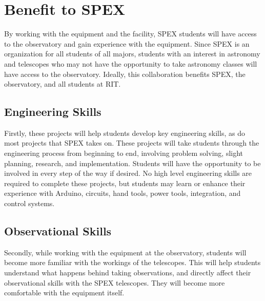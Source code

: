 \documentclass[conference]{IEEEtran} %
\begin{document}
\section{Benefit to SPEX}
\label{sec:benefit}

By working with the equipment and the facility, SPEX students will have access to the observatory and gain experience with the equipment.
Since SPEX is an organization for all students of all majors, students with an interest in astronomy and telescopes who may not have the opportunity to take astronomy classes will have access to the observatory.
Ideally, this collaboration benefits SPEX, the observatory, and all students at RIT.


\subsection{Engineering Skills}
\label{subsec:engineeringSkills}
Firstly, these projects will help students develop key engineering skills, as do most projects that SPEX takes on.
These projects will take students through the engineering process from beginning to end, involving problem solving, slight planning, research, and implementation.
Students will have the opportunity to be involved in every step of the way if desired.
No high level engineering skills are required to complete these projects, but students may learn or enhance their experience with Arduino, circuits, hand tools, power tools, integration, and control systems.

\subsection{Observational Skills}
\label{subsec:observationalSkills}
Secondly, while working with the equipment at the observatory, students will become more familiar with the workings of the telescopes.
This will help students understand what happens behind taking observations, and directly affect their observational skills with the SPEX telescopes.
They will become more comfortable with the equipment itself.
\end{document}
